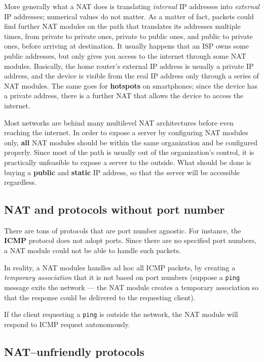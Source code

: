 \documentclass[10pt]{\classname}
\begin{document}
More generally what a NAT does is translating \emph{internal} IP addresses into
\emph{external} IP addresses; numerical values do not matter. As a matter of
fact, packets could find further NAT modules on the path that translates its
addresses multiple times, from private to private ones, private to public ones,
and public to private ones, before arriving at destination. It usually happens
that an ISP owns some public addresses, but only gives you access to the
internet through some NAT modules. Basically, the home router's external IP
address is usually a private IP address, and the device is visible from the
real IP address only through a series of NAT modules. The same goes for
\textbf{hotspots} on smartphones; since the device has a private address, there
is a further NAT that allows the device to access the internet.

Most networks are behind many multilevel NAT architectures before even reaching
the internet. In order to expose a server by configuring NAT modules only,
\textbf{all} NAT modules should be within the same organization and be
configured properly. Since most of the path is usually out of the
organization's control, it is practically unfeasible to expose a server to the
outside. What should be done is buying a \textbf{public} and \textbf{static} IP
address, so that the server will be accessible regardless.

\subsection{NAT and protocols without port number}

There are tons of protocols that are port number agnostic. For instance, the \textbf{ICMP} protocol does not adopt ports. Since there are no specified port numbers, a NAT module could not be able to handle such packets.

In reality, a NAT modules handles ad hoc all ICMP packets, by creating a
\emph{temporary association} that it is not based on port numbers (suppose a
\texttt{ping} message exits the network --- the NAT module creates a temporary
association so that the response could be delivered to the requesting client). 

If the client requesting a \texttt{ping} is outside the network, the NAT module
will respond to ICMP request autonomously.

\subsection{NAT--unfriendly protocols}
\end{document}
